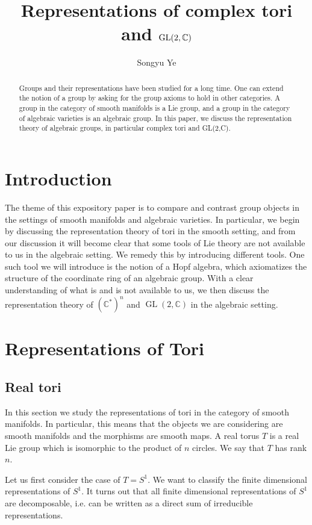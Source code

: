 \documentclass[manuscript, printscheme]{aomart}
\title[Representations of complex tori and $\GL(2,\C)$]{Representations of complex tori and $\GL(2,\C)$}
\author[Songyu Ye]{Songyu Ye}
\theoremstyle{plain} %
\theoremstyle{definition}
\theoremstyle{remark}
\DeclareMathOperator{\GL}{GL}
\newcommand{\C}{\mathbb{C}}
\begin{document}
\begin{abstract}
	Groups and their representations have been studied for a long time. One can extend the
	notion of a group by asking for the group axioms to hold in other categories. A group in
	the category of smooth manifolds is a Lie group, and a group in the category of algebraic varieties
	is an algebraic group. In this paper, we discuss the representation theory of algebraic groups,
	in particular complex tori and GL(2,C). 
\end{abstract}
\maketitle
\tableofcontents

\section{Introduction}
The theme of this expository paper is to compare and contrast group objects in the settings of smooth manifolds and algebraic varieties.
In particular, we begin by discussing the representation theory of tori in the smooth setting, and from our discussion
it will become clear that some tools of Lie theory are not available to us in the algebraic setting. We remedy this
by introducing different tools. One such tool we will introduce is the notion
of a Hopf algebra, which axiomatizes the structure of the coordinate ring of an 
algebraic group. With a clear understanding of what is and is not available to us,
we then discuss the representation theory of $(\C^*)^n$ and $\GL(2,\C)$ in the algebraic setting.

\section{Representations of Tori}
\subsection{Real tori}
In this section we study the representations of tori in the category of smooth manifolds. In particular,
this means that the objects we are considering are smooth manifolds and the morphisms are smooth maps.
A real torus $T$ is a real Lie group which is isomorphic to the product of $n$ circles.
We say that $T$ has rank $n$.

\hfill

Let us first consider the case of $T = S^1$. We want to classify the finite dimensional representations of $S^1$.
It turns out that all finite dimensional representations of $S^1$ are decomposable, i.e.
can be written as a direct sum of irreducible representations.
\end{document}
